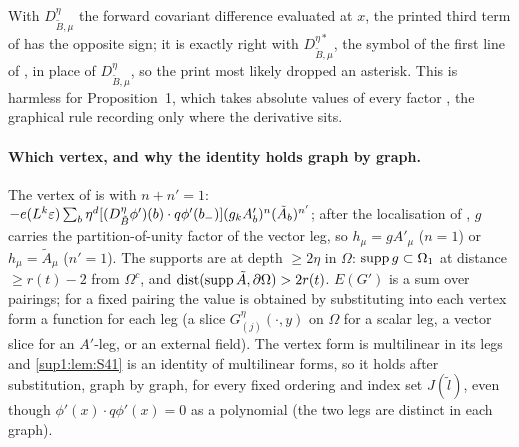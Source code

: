 \begin{remark}\label{sup1:rem:S4sign}
With $D^\eta_{\tilde B,\mu}$ the forward covariant difference \cite[(1.7)]{Ba1} evaluated at $x$, the printed third term of \cite[(2.8)]{Ba3} has the opposite sign; it is exactly right with $D^{\eta*}_{\tilde B,\mu}$, the symbol of the first line of \cite[(2.8)]{Ba3}, in place of $D^\eta_{\tilde B,\mu}$, so the print most likely dropped an asterisk. This is harmless for Proposition~1, which takes absolute values of every factor \cite[p.~426]{Ba3}, the graphical rule \cite[(2.9)]{Ba3} recording only where the derivative sits.
\end{remark}

\paragraph{Which vertex, and why the identity holds graph by graph.} The vertex of \cite[(2.4)]{Ba3} is \cite[(1.8)]{Ba3} with $n+n'=1$: $-e(L^k\varepsilon)\sum_b\eta^d[(D^\eta_{\tilde B}\phi')(b)\cdot q\phi'(b_-)](g_kA'_b)^n(\tilde A_b)^{n'}$; after the localisation of \cite[p.~420]{Ba3}, $g$ carries the partition-of-unity factor of the vector leg, so $h_\mu=gA'_\mu$ ($n=1$) or $h_\mu=\tilde A_\mu$ ($n'=1$). The supports are at depth $\ge2\eta$ in $\Omega$: $\operatorname{supp} g\subset\Omega_1$ at distance $\ge r(t)-2$ from $\Omega^c$, and $\operatorname{dist}(\operatorname{supp}\tilde A,\partial\Omega)>2r(t)$. $E(G')$ is a sum over pairings; for a fixed pairing the value is obtained by substituting into each vertex form a function for each leg (a slice $G^\eta_{(j)}(\cdot,y)$ on $\Omega$ for a scalar leg, a vector slice for an $A'$-leg, or an external field). The vertex form is multilinear in its legs and \cref{sup1:lem:S41} is an identity of multilinear forms, so it holds after substitution, graph by graph, for every fixed ordering and index set $J(\tilde l)$, even though $\phi'(x)\cdot q\phi'(x)=0$ as a polynomial (the two legs are distinct in each graph).

